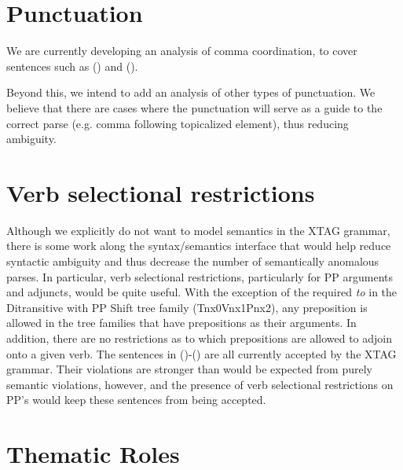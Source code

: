


\section{Punctuation}

We are currently developing an analysis of comma coordination, to
cover sentences such as () and ().


Beyond this, we intend to add an analysis of other types of punctuation. We
believe that there are cases where the punctuation will serve as a guide to the
correct parse (e.g. comma following topicalized element), thus reducing
ambiguity.


\section{Verb selectional restrictions}

Although we explicitly do not want to model semantics in the XTAG grammar,
there is some work along the syntax/semantics interface that would help reduce
syntactic ambiguity and thus decrease the number of semantically anomalous
parses.  In particular, verb selectional restrictions, particularly for PP
arguments and adjuncts, would be quite useful.  With the exception of the
required {\it to} in the Ditransitive with PP Shift tree family (Tnx0Vnx1Pnx2),
any preposition is allowed in the tree families that have prepositions as their
arguments.  In addition, there are no restrictions as to which prepositions are
allowed to adjoin onto a given verb.  The sentences in ()-() are
all currently accepted by the XTAG grammar.  Their violations are stronger than
would be expected from purely semantic violations, however, and the presence of
verb selectional restrictions on PP's would keep these sentences from being
accepted.


\section{Thematic Roles}

